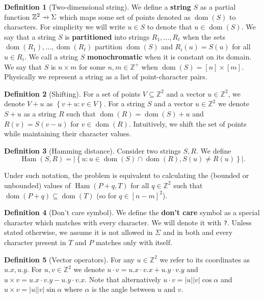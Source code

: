 \documentclass[11pt]{article}
\DeclareMathOperator*{\Ham}{Ham}
\newcommand{\Z}{\mathbb{Z}}
\renewcommand{\phi}{\varphi}
\newcommand{\set}[1]{\left\lbrace #1 \right\rbrace}
\theoremstyle{plain}
\theoremstyle{definition}
\newtheorem{definition}{Definition}
\theoremstyle{remark}
\DeclareMathOperator*{\dom}{dom}
\begin{document}
\newcommand{\pto}{\mathrel{\ooalign{\hfil$\mapstochar\mkern5mu$\hfil\cr$\to$\cr}}}
\renewcommand{\d}[1]{\dom(#1)}
\newcommand{\f}[1]{#1^\mathbf{f}}
\begin{definition}[Two-dimensional string]
	We define a \textbf{string} $S$ as a partial function $\Z^2 \pto \Sigma$ which maps some set of points denoted as $\d{S}$ to characters.
	For simplicity we will write $u \in S$ to denote that $u \in \d{S}$.
	We say that a string $S$ is \textbf{partitioned} into strings $R_1, \dots, R_\ell$ when the sets $\d{R_1}, \dots, \d{R_\ell}$ partition $\d{S}$ and $R_i(u) = S(u)$ for all $u \in R_i$.
	We call a string $S$ \textbf{monochromatic} when it is constant on its domain.
	We say that $S$ is $n \times m$ for some $n, m \in \Z^+$ when $\d{S} = [n] \times [m]$.
	Physically we represent a string as a list of point-character pairs.
\end{definition}


\begin{definition}[Shifting]
	For a set of points $V \subseteq \Z^2$ and a vector $u \in \Z^2$, we denote $V + u$ as $\set{v + u : v \in V}$.
	For a string $S$ and a vector $u \in \Z^2$ we denote $S + u$ as a string $R$ such that
	$\d{R} = \d{S} + u$ and $R(v) = S(v - u)$ for $v \in \d{R}$.
	Intuitively, we shift the set of points while maintaining their character values.
\end{definition}


\begin{definition}[Hamming distance]
	Consider two strings $S, R$. We define
	$$ \Ham(S, R) = |\set{u : u \in \d{S} \cap \d{R}, S(u) \neq R(u)}|.$$
\end{definition}


Under such notation, the \HD problem is equivalent to calculating the (bounded or unbounded) values of $ \Ham(P + q, T) $
for all $q \in \Z^2$ such that $\d{P + q} \subseteq \d{T}$ (so for $q \in [n - m]^2$).


\begin{definition}[Don't care symbol]
	We define the \textbf{don't care} symbol as a special character which matches with every character.
	We will denote it with \texttt{?}.
	Unless stated otherwise, we assume it is not allowed in $\Sigma$ and in both \hd and \HD every character present in $T$ and $P$ matches only with itself.
\end{definition}


\newcommand{\x}[1]{#1.x}
\newcommand{\y}[1]{#1.y}
\newcommand{\h}[1]{\phi \times #1}
\newcommand{\s}[1]{\psi \times #1}
\begin{definition}[Vector operators]
	For any $u \in \Z^2$ we refer to its coordinates as $\x{u}, \y{u}$.
	For $u, v \in \Z^2$ we denote $u \cdot v = \x{u} \cdot \x{v} + \y{u} \cdot \y{v}$
	and $u \times v = \x{u} \cdot \y{v} - \y{u} \cdot \x{v}$.
	Note that alternatively $u \cdot v = |u||v| \cos \alpha$ and $u \times v = |u||v| \sin \alpha$ where $\alpha$ is the angle between $u$ and $v$.
\end{definition}
\end{document}
